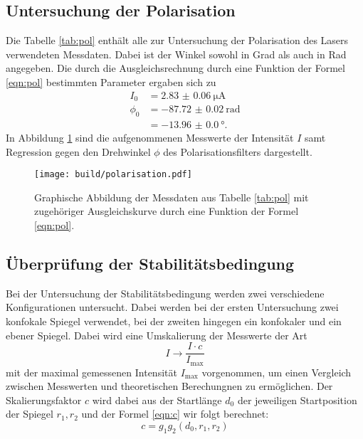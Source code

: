 \subsection{Untersuchung der Polarisation}
Die Tabelle \ref{tab:pol} enthält alle zur Untersuchung der Polarisation
des Lasers verwendeten Messdaten. Dabei ist der Winkel sowohl in Grad als
auch in Rad angegeben.
Die durch die Ausgleichsrechnung durch eine Funktion der Formel \ref{eqn:pol}
bestimmten Parameter ergaben sich zu
\begin{align*}
  I_0 &= \SI{2.83(6)}{\micro\ampere} \\
  \phi_0 &= \SI{-87.72(2)}{\radian} \\
      &= \SI{-13.96(0)}{\degree}.
\end{align*}
In Abbildung \ref{plt:pol} sind die aufgenommenen Messwerte der Intensität $I$ samt
Regression gegen den Drehwinkel $\phi$ des Polarisationsfilters dargestellt.

\begin{figure}[htb]
  \centering
  \texttt{[image: build/polarisation.pdf]}
  \caption{Graphische Abbildung der Messdaten aus Tabelle \ref{tab:pol} mit zugehöriger Ausgleichskurve durch eine Funktion der Formel \ref{eqn:pol}.}
  \label{plt:pol}
\end{figure}


\FloatBarrier

\subsection{Überprüfung der Stabilitätsbedingung}
Bei der Untersuchung der Stabilitätsbedingung werden zwei verschiedene
Konfigurationen untersucht. Dabei werden bei der ersten Untersuchung zwei
konfokale Spiegel verwendet, bei der zweiten hingegen ein konfokaler und
ein ebener Spiegel. Dabei wird eine Umskalierung der Messwerte der Art
\begin{equation*}
  I \rightarrow \frac{I \cdot c}{I_\text{max}}
\end{equation*}
mit der maximal gemessenen Intensität $I_\text{max}$ vorgenommen, um einen
Vergleich zwischen Messwerten und theoretischen
Berechungnen zu ermöglichen.
Der Skalierungsfaktor $c$ wird dabei aus der Startlänge $d_0$ der jeweiligen
Startposition der Spiegel $r_1, r_2$ und der Formel \ref{eqn:c} wir folgt
berechnet:
\begin{equation}
  c = g_1g_2(d_0,r_1,r_2)
  \label{eqn:c}
\end{equation}

